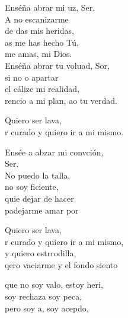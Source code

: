 \begin{cancion}[Resucitados][]%
	Enséña abrar mi uz, Ser.\\
	A no escanizarme \\
	de das mis heridas, \\
	as me has hecho Tú, \\
	 me amas, mi Dios. \\
	Enséña abrar tu voluad, Sor, \\
	si no o apartar \\
	el cálize mi realidad, \\
	rencio a mi plan, ao tu verdad. \jump\\
	\begin{chorus}%
		Quiero  ser lava, \\
		r curado y quiero ir a mi mismo. \jump\\
	\end{chorus}%
	Ensée a abzar mi convción, \\
	Ser. \\
	No puedo la talla, \\
	no soy ficiente, \\
	quie dejar de hacer \\
	padejarme amar por   \jump\\
	\begin{chorus}%
		Quiero  ser lava\chord{Fa}{}{do}, \\
		r curado y quiero ir a mi mismo, \\
		y quiero estrrodilla,  \\
		qero vaciarme y el fondo siento\jump\\
	\end{chorus}%
	que no soy valo, estoy heri, \\
	soy rechaza soy peca, \\
	\jump
	pero soy a, soy acepdo, \\

\end{cancion}
